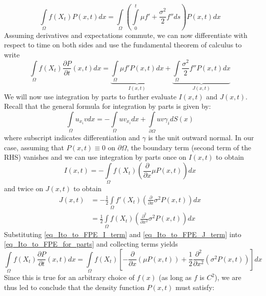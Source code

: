 \begin{equation*}
    \int\limits_{\Omega}f(X_t)P(x,t)dx = \int\limits_{\Omega}\left(\int\limits_{0}^{t}\mu f' + \frac{\sigma^2}{2}f''ds\right)P(x,t)dx
\end{equation*}
Assuming derivatives and expectations commute, we can now differentiate with respect to time on both sides and use the fundamental theorem of calculus to write
\begin{equation}
\label{eq_Ito_to_FPE_for_parts}
\int\limits_{\Omega}f(X_t)\frac{\partial P}{\partial t}(x,t)dx = \underbrace{\int\limits_{\Omega}\mu f'P(x,t)dx}_{I(x,t)} + \underbrace{\int\limits_{\Omega}\frac{\sigma^2}{2}f''P(x,t)dx}_{J(x,t)}
\end{equation}
We will now use integration by parts to further evaluate $I(x,t)$ and $J(x,t)$. Recall that the general formula for integration by parts is given by:
\begin{equation*}
    \int\limits_{\Omega}u_{x_i}vdx = -\int\limits_{\Omega}uv_{x_i}dx + \int\limits_{\partial\Omega}uv\gamma_{i}dS(x)
\end{equation*}
where subscript indicates differentiation and $\gamma$ is the unit outward normal. In our case, assuming that $P(x,t) \equiv 0$ on $\partial \Omega$, the boundary term (second term of the RHS) vanishes and we can use integration by parts once on $I(x,t)$ to obtain
\begin{equation}
\label{eq_Ito_to_FPE_I_term}
    I(x,t) = - \int\limits_{\Omega}f(X_t)\left(\frac{\partial}{\partial x}\mu P(x,t)\right)dx
\end{equation}
and twice on $J(x,t)$ to obtain
\begin{align}
    J(x,t) &= - \frac{1}{2}\int\limits_{\Omega}f'(X_t)\left(\frac{\partial}{\partial x}\sigma^2 P(x,t)\right)dx\nonumber\\
    &= \frac{1}{2}\int\limits_{\Omega}f(X_t)\left(\frac{\partial^2}{\partial x^2}\sigma^2 P(x,t)\right)dx\label{eq_Ito_to_FPE_J_term}
\end{align}
Substituting \eqref{eq_Ito_to_FPE_I_term} and \eqref{eq_Ito_to_FPE_J_term} into \eqref{eq_Ito_to_FPE_for_parts} and collecting terms yields
\begin{equation*}
    \int\limits_{\Omega}f(X_t)\frac{\partial P}{\partial t}(x,t)dx = \int\limits_{\Omega}f(X_t)\left[-\frac{\partial}{\partial x}(\mu P(x,t)) + \frac{1}{2}\frac{\partial^2}{\partial x^2}(\sigma^2P(x,t))\right]dx
\end{equation*}
Since this is true for an arbitrary choice of $f(x)$ (as long as $f$ is $C^2$), we are thus led to conclude that the density function $P(x,t)$ must satisfy:
